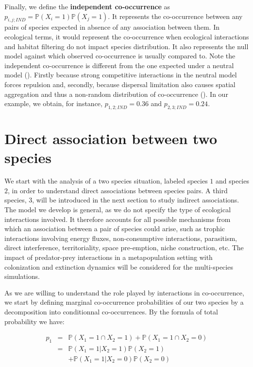 Finally, we define the \textbf{independent co-occurrence} as
$p_{i,j;IND}=\mathbb{P}(X_{i}=1)\mathbb{P}(X_{j}=1)$. It represents the
co-occurrence between any pairs of species expected in absence of any
association between them. In ecological terms, it would represent the
co-occurrence when ecological interactions and habitat filtering do not impact
species distribution. It also represents the null model against which
observed co-occurrence is usually compared to. Note the independent
co-occurrence is different from the one expected under a neutral model
(\citealt{Hubbell2001Unified}). Firstly because strong competitive interactions in
the neutral model forces repulsion and, secondly, because dispersal limitation
also causes spatial aggregation and thus a non-random distribution of
co-occurrence (\citealt{Bell2005CoDistribution}). In our example, we obtain, for instance, $p_{1,2;IND}=0.36$ and $p_{2,3;IND}=0.24$.

\section*{Direct association between two species}
\label{direct}

We start with the analysis of a two species situation, labeled species $1$ and
species $2$, in order to understand direct associations between species pairs. A
third species, $3$, will be introduced in the next section to study indirect
associations. The model we develop is general, as we do not specify the type of
ecological interactions involved. It therefore accounts for all possible mechanisms from
which an association between a pair of species could arise, such as trophic
interactions involving energy fluxes, non-consumptive interactions, parasitism,
direct interference, territoriality, space pre-emption, niche construction,
etc. The impact of predator-prey interactions in a metapopulation setting with
colonization and extinction dynamics will be considered for the multi-species
simulations.

As we are willing to understand the role played by interactions in co-occurrence, we start by defining marginal co-occurrence probabilities of our two species by a decomposition into conditionnal co-occurrences. By the formula of total probability we have:

  \begin{eqnarray} \label{s2ind}
    \nonumber p_1&=& \mathbb{P}(X_{1}=1\cap X_{2}=1)+ \mathbb{P}(X_{1}=1\cap X_{2}=0)\\
    \nonumber \label{sp2ind} &=& \mathbb{P}(X_{1}=1| X_{2}=1)\mathbb{P}(X_{2}=1) \\
    &&+ \mathbb{P}(X_{1}=1| X_{2}=0)\mathbb{P}(X_{2}=0)
  \end{eqnarray}

